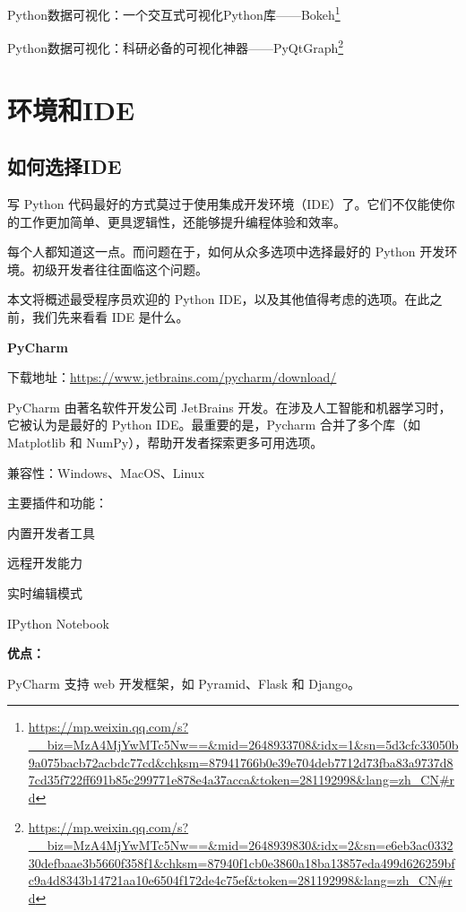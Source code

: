 \documentclass[]{ctexbook}
\renewcommand{\href}[2]{#2\footnote{\url{#1}}}
\begin{document}
\href{https://mp.weixin.qq.com/s?__biz=MzA4MjYwMTc5Nw==\&mid=2648933708\&idx=1\&sn=5d3cfc33050b9a075bacb72acbdc77cd\&chksm=87941766b0e39e704deb7712d73fba83a9737d87cd35f722ff691b85c299771e878e4a37acca\&token=281192998\&lang=zh_CN\#rd}{Python数据可视化：一个交互式可视化Python库------Bokeh}

\href{https://mp.weixin.qq.com/s?__biz=MzA4MjYwMTc5Nw==\&mid=2648939830\&idx=2\&sn=e6eb3ac033230defbaae3b5660f358f1\&chksm=87940f1cb0e3860a18ba13857eda499d626259bfc9a4d8343b14721aa10e6504f172de4c75ef\&token=281192998\&lang=zh_CN\#rd}{Python数据可视化：科研必备的可视化神器------PyQtGraph}

\hypertarget{ux73afux5883ux548cide}{%
\section{环境和IDE}\label{ux73afux5883ux548cide}}

\hypertarget{ux5982ux4f55ux9009ux62e9ide}{%
\subsection{如何选择IDE}\label{ux5982ux4f55ux9009ux62e9ide}}

写 Python 代码最好的方式莫过于使用集成开发环境（IDE）了。它们不仅能使你的工作更加简单、更具逻辑性，还能够提升编程体验和效率。

每个人都知道这一点。而问题在于，如何从众多选项中选择最好的 Python 开发环境。初级开发者往往面临这个问题。

本文将概述最受程序员欢迎的 Python IDE，以及其他值得考虑的选项。在此之前，我们先来看看 IDE 是什么。

\textbf{PyCharm}

下载地址：\url{https://www.jetbrains.com/pycharm/download/}

PyCharm 由著名软件开发公司 JetBrains 开发。在涉及人工智能和机器学习时，它被认为是最好的 Python IDE。最重要的是，Pycharm 合并了多个库（如 Matplotlib 和 NumPy），帮助开发者探索更多可用选项。

兼容性：Windows、MacOS、Linux

主要插件和功能：

内置开发者工具

远程开发能力

实时编辑模式

IPython Notebook

\textbf{优点：}

PyCharm 支持 web 开发框架，如 Pyramid、Flask 和 Django。
\end{document}
